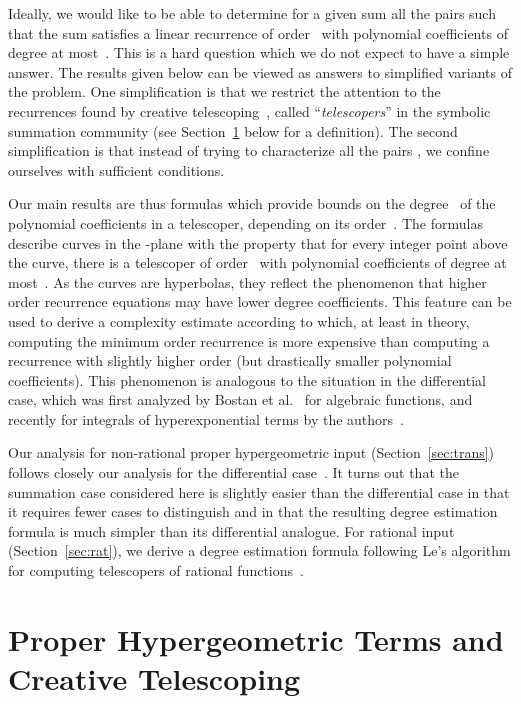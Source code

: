 \documentclass{sig-alternate}
\begin{document}
Ideally, we would like to be able to determine for a given sum all the pairs
 such that the sum satisfies a linear recurrence of order~ with
polynomial coefficients of degree at most~. This is a hard question which we
do not expect to have a simple answer. The results given below can be viewed as
answers to simplified variants of the problem. One simplification is that we
restrict the attention to the recurrences found by creative
telescoping~\cite{zeilberger91}, called ``\emph{telescopers}'' in the symbolic summation
community (see Section~\ref{sec:hg} below for a definition). The second
simplification is that instead of trying to characterize all the pairs ,
we confine ourselves with sufficient conditions.

Our main results are thus formulas which provide bounds on the degree~
of the polynomial coefficients in a telescoper, depending on its order~. The
formulas describe curves in the -plane with the property that for every
integer point  above the curve, there is a telescoper of order~ with
polynomial coefficients of degree at most~. As the curves are hyperbolas,
they reflect the phenomenon that higher order recurrence equations may have
lower degree coefficients. This feature can be used to derive a complexity
estimate according to which, at least in theory, computing the minimum order
recurrence is more expensive than computing a recurrence with slightly higher
order (but drastically smaller polynomial coefficients). This phenomenon is
analogous to the situation in the differential case, which was first analyzed by
Bostan et al.~\cite{bostan07} for algebraic functions, and recently for
integrals of hyperexponential terms by the authors~\cite{chen11}.

Our analysis for non-rational proper hypergeometric input
(Section~\ref{sec:trans}) follows closely our analysis for the differential
case~\cite{chen11}. It turns out that the summation case considered here is
slightly easier than the differential case in that it requires fewer cases to
distinguish and in that the resulting degree estimation formula is much simpler
than its differential analogue. For rational input (Section~\ref{sec:rat}), we
derive a degree estimation formula following Le's algorithm for computing
telescopers of rational functions~\cite{abramov02,le03}.

\section{Proper Hypergeometric Terms and Creative Telescoping}\label{sec:hg}
\end{document}
